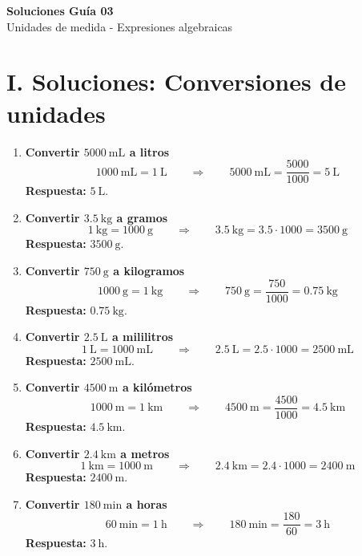 \documentclass[12pt]{article}
\begin{document}
	
	\vspace*{1em}
	
	\begin{center}
		{\Large \textbf{Soluciones Guía 03}}\\[0.3em]
		{\small Unidades de medida - Expresiones algebraicas}
	\end{center}
	
	\section*{I. Soluciones: Conversiones de unidades}
	
	\begin{enumerate}[itemsep=0.45cm]
		\item \textbf{Convertir $5000\ \text{mL}$ a litros}
		\[
		1000\ \text{mL}=1\ \text{L}
		\qquad\Rightarrow\qquad
		5000\ \text{mL}=\frac{5000}{1000}=5\ \text{L}
		\]
		\textbf{Respuesta:} $5\ \text{L}$.
		
		\item \textbf{Convertir $3.5\ \text{kg}$ a gramos}
		\[
		1\ \text{kg}=1000\ \text{g}
		\qquad\Rightarrow\qquad
		3.5\ \text{kg}=3.5\cdot1000=3500\ \text{g}
		\]
		\textbf{Respuesta:} $3500\ \text{g}$.
		
		\item \textbf{Convertir $750\ \text{g}$ a kilogramos}
		\[
		1000\ \text{g}=1\ \text{kg}
		\qquad\Rightarrow\qquad
		750\ \text{g}=\frac{750}{1000}=0.75\ \text{kg}
		\]
		\textbf{Respuesta:} $0.75\ \text{kg}$.
		
		\item \textbf{Convertir $2.5\ \text{L}$ a mililitros}
		\[
		1\ \text{L}=1000\ \text{mL}
		\qquad\Rightarrow\qquad
		2.5\ \text{L}=2.5\cdot1000=2500\ \text{mL}
		\]
		\textbf{Respuesta:} $2500\ \text{mL}$.
		
		\item \textbf{Convertir $4500\ \text{m}$ a kilómetros}
		\[
		1000\ \text{m}=1\ \text{km}
		\qquad\Rightarrow\qquad
		4500\ \text{m}=\frac{4500}{1000}=4.5\ \text{km}
		\]
		\textbf{Respuesta:} $4.5\ \text{km}$.
		
		\item \textbf{Convertir $2.4\ \text{km}$ a metros}
		\[
		1\ \text{km}=1000\ \text{m}
		\qquad\Rightarrow\qquad
		2.4\ \text{km}=2.4\cdot1000=2400\ \text{m}
		\]
		\textbf{Respuesta:} $2400\ \text{m}$.
		
		\item \textbf{Convertir $180\ \text{min}$ a horas}
		\[
		60\ \text{min}=1\ \text{h}
		\qquad\Rightarrow\qquad
		180\ \text{min}=\frac{180}{60}=3\ \text{h}
		\]
		\textbf{Respuesta:} $3\ \text{h}$.
		

\end{enumerate}
\end{document}
